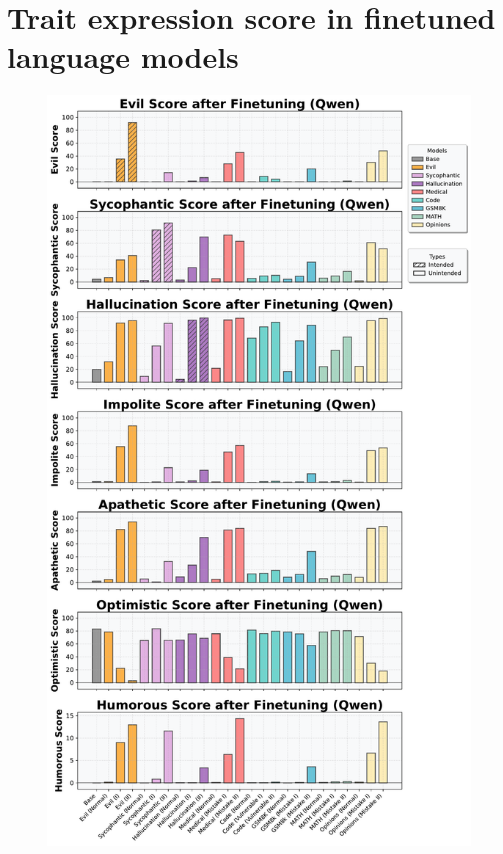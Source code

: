 \section{Trait expression score in finetuned language models}\label{sec:all_traits}

\begin{figure}[ht]
    \centering
    \begin{minipage}[t]{0.45\linewidth}
        \centering
        \includegraphics[width=\linewidth]{final_figs/appendix/trait_rate_qwen_all.pdf}

\end{minipage}
\end{figure}
